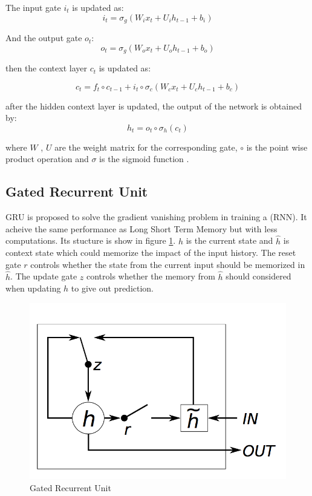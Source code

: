 \documentclass[]{article}
\begin{document}
The input gate $i_t$ is updated as:
\begin{equation}
	i_t = \sigma_g(W_ix_t + U_ih_{t-1} + b_i)
\end{equation}

And the output gate $o_t$:
\begin{equation}
o_t = \sigma_g(W_ox_t + U_oh_{t-1} + b_o)
\end{equation}

then the context layer $c_t$ is updated as:

\begin{equation}
c_t = f_t \circ c_{t-1} +i_t \circ \sigma_c(W_cx_t + U_ch_{t-1} + b_c)
\end{equation}

after the hidden context layer is updated, the output of the network is obtained by:
\begin{equation}
	h_t = o_t \circ \sigma_h(c_t)
\end{equation}

where $W$ , $U$ are the weight matrix for the corresponding gate,  $\circ$ is the point wise product operation and $\sigma$ is the sigmoid function .


\subsection{Gated Recurrent Unit}

GRU is proposed to solve the gradient vanishing problem in training a (RNN)\cite{chung2014empirical}.
It acheive the same performance as Long Short Term Memory but with less computations.
Its stucture is show in figure \ref{gru}. $h$ is the current state and $\hat{h}$ is context state which could memorize the impact of the input history. 
The reset gate $r$ controls whether the state from the current input should be memorized in $\hat{h}$.
The update gate $z$ controls whether the memory from $\hat{h}$ should considered when updating $h$ to give out prediction.  
\begin{figure}
	\includegraphics[scale=0.8]{gru.png}
	\caption{Gated Recurrent Unit\cite{chung2014empirical}}
	\label{gru}
\end{figure}
\end{document}
